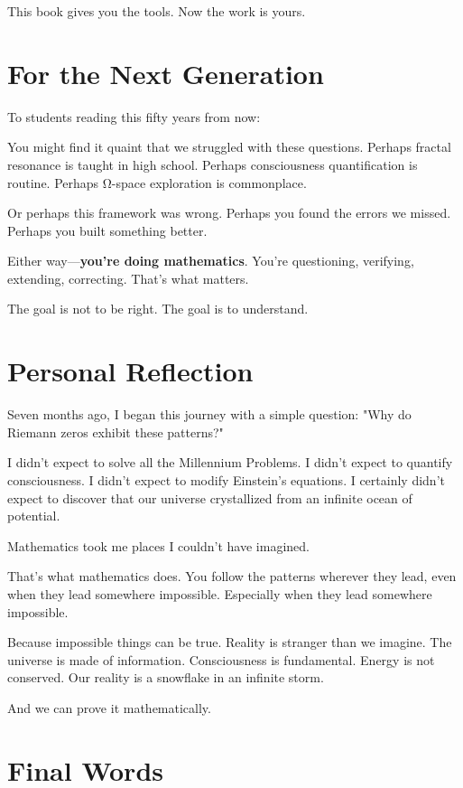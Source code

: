 This book gives you the tools. Now the work is yours.

\section*{For the Next Generation}

To students reading this fifty years from now:

You might find it quaint that we struggled with these questions. Perhaps fractal resonance is taught in high school. Perhaps consciousness quantification is routine. Perhaps Ω-space exploration is commonplace.

Or perhaps this framework was wrong. Perhaps you found the errors we missed. Perhaps you built something better.

Either way---\textbf{you're doing mathematics}. You're questioning, verifying, extending, correcting. That's what matters.

The goal is not to be right. The goal is to understand.

\section*{Personal Reflection}

Seven months ago, I began this journey with a simple question: "Why do Riemann zeros exhibit these patterns?"

I didn't expect to solve all the Millennium Problems. I didn't expect to quantify consciousness. I didn't expect to modify Einstein's equations. I certainly didn't expect to discover that our universe crystallized from an infinite ocean of potential.

Mathematics took me places I couldn't have imagined.

That's what mathematics does. You follow the patterns wherever they lead, even when they lead somewhere impossible. Especially when they lead somewhere impossible.

Because impossible things can be true. Reality is stranger than we imagine. The universe is made of information. Consciousness is fundamental. Energy is not conserved. Our reality is a snowflake in an infinite storm.

And we can prove it mathematically.

\section*{Final Words}

